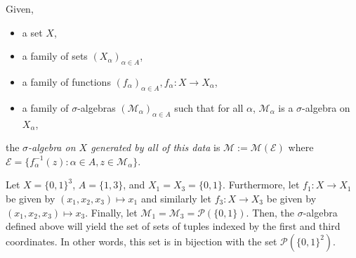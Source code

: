 \documentclass[11pt,leqno,oneside]{amsbook}
\numberwithin{thm}{section}
\renewcommand{\P}{\mathcal{P}} %
\newcommand{\M}{\mathcal{M}} %
\newcommand{\Ep}{\mathcal{E}} %
\newcommand{\s}{$\sigma$-} %
\begin{document}
\begin{defn}\label{gen-sigma-alg-product}
  Given,
  \begin{itemize}
  \item a set $X$,
  \item a family of sets $(X_\alpha)_{\alpha \in A}$,
  \item a family of functions $(f_\alpha)_{\alpha \in A}, f_\alpha: X
    \to X_\alpha$,
  \item a family of \s algebras $(\M_\alpha)_{\alpha \in A}$ such
    that for all $\alpha$, $\M_\alpha$ is a \s algebra on
    $X_\alpha$,
  \end{itemize}
  the \emph{\s algebra on $X$ generated by all of this data} is
  $\M := \M(\Ep)$ where $\Ep = \{f_\alpha^{-1}(z) : \alpha \in A, z \in
  \M_\alpha\}$.
\end{defn}
\begin{example}
  Let $X = \{0,1\}^3$, $A = \{1,3\}$, and $X_1 = X_3 =
  \{0,1\}$. Furthermore, let $f_1\colon  X \to X_1$ be given by
  $(x_1,x_2,x_3) \mapsto x_1$ and similarly let $f_3\colon  X \to X_3$ be given by $(x_1,x_2,x_3) \mapsto x_3$. Finally, let
  $\M_1 = \M_3 = \P(\{0,1\})$. Then, the \s algebra defined
  above will yield the set of sets of tuples indexed by the first and
  third coordinates. In other words, this set is in bijection with the
  set $\P(\{0,1\}^2)$.
\end{example}
\end{document}
